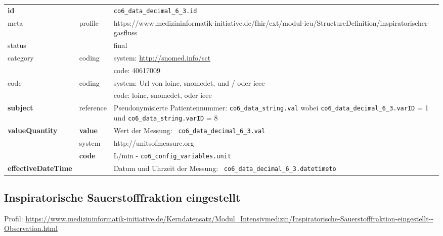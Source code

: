 \begin{longtable}{|l|l|p{7.5cm}|}
        \hline
        \rowcolor{lightgray} \multicolumn{3}{|l|}{Data Mapping (inhaltlich)} \\ \hline
        \textbf{id} &  & \texttt{co6\_data\_decimal\_6\_3.id} \\ \hline
	meta & profile & https://www.medizininformatik-initiative.de/fhir/ext/modul-icu/StructureDefinition/inspiratorischer-gasfluss \\ \hline 
	status &  & final   \\ \hline 
	category & coding & system: \url{http://snomed.info/sct} \\
\cline{3-3}
	& & code: 40617009 \\ \hline
	code & coding & system: Url von \ac{loinc}, \ac{snomedct}, und / oder \ac{ieee} \\ 
	\cline{3-3} 
	 &  & code: \ac{loinc}, \ac{snomedct}, oder \ac{ieee} \\ \hline
	 \textbf{subject} & reference & Pseudonymisierte Patientennummer: \texttt{co6\_data\_string.val} wobei \texttt{co6\_data\_decimal\_6\_3.varID} = 1 und \texttt{co6\_data\_string.varID} = 8 \\ \hline
	 \textbf{valueQuantity}  & \textbf{value} & Wert der Messung: \texttt{
co6\_data\_decimal\_6\_3.val} \\
        \cline{2-3}
         & system & http://unitsofmeasure.org \\
         \cline{2-3}
         & \textbf{code} & L/min - \texttt{co6\_config\_variables.unit} \\ \hline
     \textbf{effectiveDateTime}  & & Datum und Uhrzeit der Messung: \texttt{
co6\_data\_decimal\_6\_3.datetimeto} \\
     \hline
\end{longtable}

\subsection{Inspiratorische Sauerstofffraktion eingestellt} 

Profil: \url{https://www.medizininformatik-initiative.de/Kerndatensatz/Modul_Intensivmedizin/Inspiratorische-Sauerstofffraktion-eingestellt--Observation.html}

